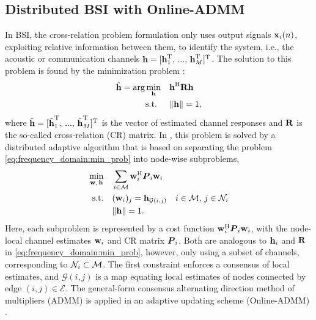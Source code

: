 \documentclass{article}
\begin{document}
\subsection[]{Distributed BSI with Online-ADMM}
In BSI, the cross-relation problem formulation only uses output signals \(\bm{\mathrm{x}}_i(n)\), exploiting relative information between them, to identify the system, i.e., the acoustic or communication channels \(\bm{\mathrm{h}} = [\bm{\mathrm{h}}_1^{\mathrm{T}},\,...,\,\bm{\mathrm{h}}_M^{\mathrm{T}}]^{\mathrm{T}}\).
The solution to this problem is found by the minimization problem \cite{langtongBlindIdentificationEqualization1994,huangAdaptiveMultichannelLeast2002,huangClassFrequencydomainAdaptive2003,blochbergerDBSI}:
\begin{equation}
    \begin{aligned}
        \hat{\bm{\mathrm{h}}} = \arg \min_{\bm{\mathrm{h}}} \quad &\bm{\mathrm{h}}^{\mathrm{H}} \bm{\mathrm{R}} \bm{\mathrm{h}} \\
        \text{s.t. } \quad &\|\bm{\mathrm{h}}\| = 1,
    \end{aligned}\label{eq:frequency_domain:min_prob}
\end{equation}
where \(\hat{\bm{\mathrm{h}}} = [\hat{\bm{\mathrm{h}}}_1^{\mathrm{T}},\,...,\,\hat{\bm{\mathrm{h}}}_M^{\mathrm{T}}]^{\mathrm{T}}\) is the vector of estimated channel responses and \(\bm{\mathrm{R}}\) is the so-called cross-relation (CR) matrix.
In \cite{blochbergerDBSI}, this problem is solved by a distributed adaptive algorithm that is based on separating the problem \eqref{eq:frequency_domain:min_prob} into node-wise subproblems,
\begin{equation}
    \begin{aligned}
        \underset{\bm{\mathrm{w}},\,\bm{\mathrm{h}}}{\min} \quad &\sum_{i \in \mathcal{M}} \bm{\mathrm{w}}_i^{\mathrm{H}} {\bm{{P}}}_i \bm{\mathrm{w}}_i\\
        \text{s.t.} \quad &(\bm{\mathrm{w}}_i)_j = \bm{\mathrm{h}}_{\mathcal{G}(i,j)}\quad i \in \mathcal{M},\,j \in \mathcal{N}_i\\
        &\|\bm{\mathrm{h}}\| = 1.
    \end{aligned}\label{eq:general_consensus_admm:min_prob}
\end{equation}
Here, each subproblem is represented by a cost function \(\bm{\mathrm{w}}_i^{\mathrm{H}} {\bm{{P}}}_i \bm{\mathrm{w}}_i\), with the node-local channel estimates \(\bm{\mathrm{w}}_i\) and CR matrix \({\bm{{P}}}_i\).
Both are analogous to \(\bm{\mathrm{h}}_i\) and \(\bm{\mathrm{R}}\) in \eqref{eq:frequency_domain:min_prob}, however, only using a subset of channels, corresponding to \(\mathcal{N}_i \subset \mathcal{M}\).
The first constraint enforces a consensus of local estimates, and \(\mathcal{G}(i,j)\) is a map equating local estimates of nodes connected by edge \((i,j) \in \mathcal{E}\).
The general-form consensus alternating direction method of multipliers (ADMM) \cite{boydDistributedOptimizationStatistical2011} is applied in an adaptive updating scheme (Online-ADMM) \cite{wangOnlineAlternatingDirection2013,hosseiniOnlineDistributedADMM2014}.
\end{document}

